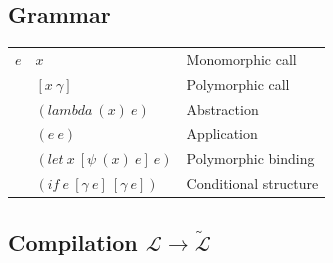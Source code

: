 \documentclass[a4paper]{report}
\newcommand{\lang}[0]{\mathcal{L}}
\newcommand{\locus}[1]{\widetilde{#1}}
\begin{document}
\subsection{Grammar}

\begin{table}
\centering
\begin{tabular}{|r|l|l|}
\hline
$e$ & $x$ & Monomorphic call\\
& $[x\ \gamma]$ & Polymorphic call\\
& $(lambda\ (x)\ e)$ & Abstraction\\
& $(e\ e)$ & Application\\
& $(let\ x\ [\psi\ (x)\ e]\ e)$ & Polymorphic binding\\
& $(if\ e\ [\gamma\ e]\ [\gamma\ e])$ & Conditional structure\\
\hline
\end{tabular}
\end{table}

\subsection{Compilation $\lang\to\locus{\lang}$}
\end{document}
